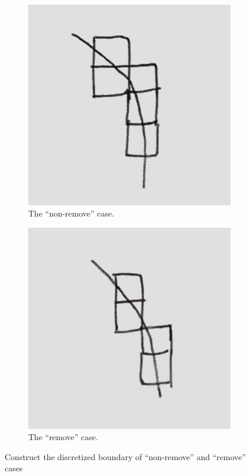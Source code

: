 \documentclass[letterpaper]{article}
\numberwithin{equation}{section} %
\numberwithin{figure}{section} %
\numberwithin{table}{section} %
\begin{document}
\begin{figure}[htbp]
	\centering
	\begin{subfigure}[b]{0.2\textwidth}
		\includegraphics[width=\textwidth]{NonrmvSetup}
		\caption{The \enquote{non-remove} case.}
		\label{NonrmvSetup}
	\end{subfigure}
	\begin{subfigure}[b]{0.2\textwidth}
		\includegraphics[width=\textwidth]{RmvSetup}
		\caption{The \enquote{remove} case.}
		\label{RmvSetup}
	\end{subfigure}

	\caption{Construct the discretized boundary of \enquote{non-remove} and \enquote{remove} cases}
	\label{Construct the discretized boundary of "non-remove" and "remove" cases}
\end{figure}
\end{document}
